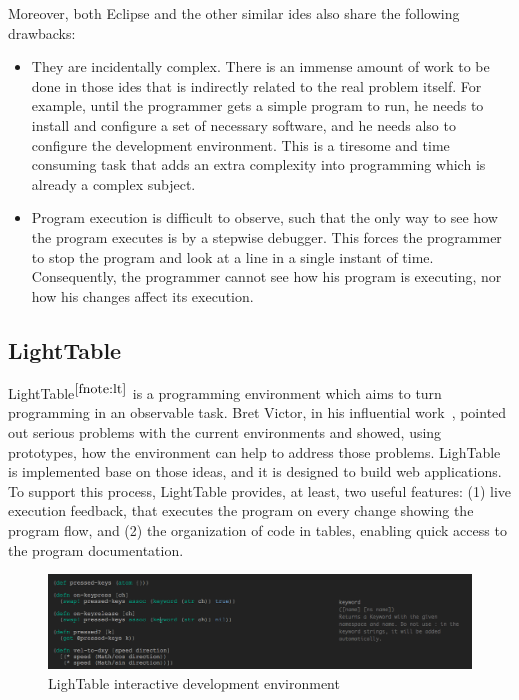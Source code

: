Moreover, both Eclipse and the other similar \glspl{ide} also share the following drawbacks:
\begin{itemize}
	\item They are incidentally complex. There is an immense amount of work to be done in those \glspl{ide} that is indirectly related to the real problem itself. For example, until the programmer gets a simple program to run, he needs to install and configure a set of necessary software, and he needs also to configure the development environment. This is a tiresome and time consuming task that adds an extra complexity into programming which is already a complex subject.

	\item Program execution is difficult to observe, such that the only way to see how the program executes is by a stepwise debugger. This forces the programmer to stop the program and look at a line in a single instant of time. Consequently, the programmer cannot see how his program is executing, nor how his changes affect its execution.
\end{itemize}
\subsection{LightTable}
\label{subsec:lighttable}
LightTable$^{\ref{fnote:lt}}$ is a programming environment which aims to turn programming in an observable task. Bret Victor, in his influential work~\cite{inventingPrin,learnableProg}, pointed out serious problems with the current environments and showed, using prototypes, how the environment can help to address those problems. LighTable is implemented base on those ideas, and it is designed to build web applications. To support this process, LightTable provides, at least, two useful features: (1) live execution feedback, that executes the program on every change showing the program flow, and (2) the organization of code in tables, enabling quick access to the program documentation.

\begin{figure}[!htbp]
  \centering
  \includegraphics[width=1.0\textwidth]{images/lt2}
    \caption{LighTable interactive development environment}
  \label{fig:lt}
\end{figure} 

